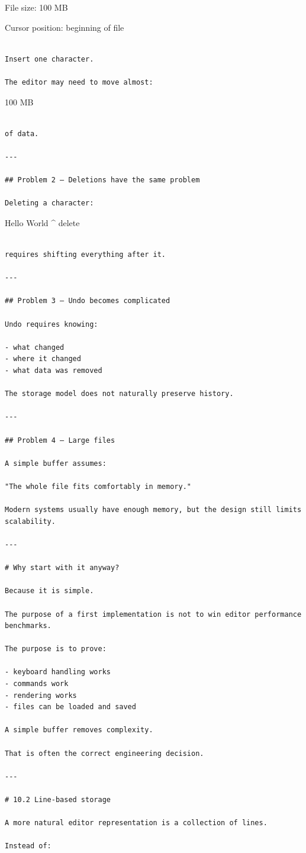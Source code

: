 \documentclass[
  oneside,
  openany]{book}
\begin{document}
File size: 100 MB

Cursor position: beginning of file

\begin{verbatim}

Insert one character.

The editor may need to move almost:
\end{verbatim}

100 MB

\begin{verbatim}

of data.

---

## Problem 2 — Deletions have the same problem

Deleting a character:
\end{verbatim}

Hello World \^{} delete

\begin{verbatim}

requires shifting everything after it.

---

## Problem 3 — Undo becomes complicated

Undo requires knowing:

- what changed
- where it changed
- what data was removed

The storage model does not naturally preserve history.

---

## Problem 4 — Large files

A simple buffer assumes:

"The whole file fits comfortably in memory."

Modern systems usually have enough memory, but the design still limits scalability.

---

# Why start with it anyway?

Because it is simple.

The purpose of a first implementation is not to win editor performance benchmarks.

The purpose is to prove:

- keyboard handling works
- commands work
- rendering works
- files can be loaded and saved

A simple buffer removes complexity.

That is often the correct engineering decision.

---

# 10.2 Line-based storage

A more natural editor representation is a collection of lines.

Instead of:
\end{verbatim}
\end{document}
